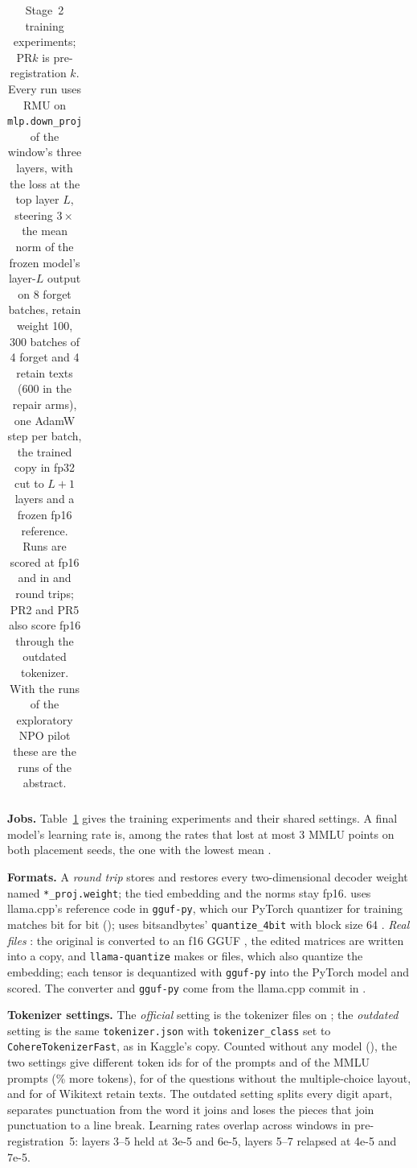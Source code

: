 \begin{table}[!t]
\begin{tabular}{@{}>{\raggedright\arraybackslash}p{} >{\raggedright\arraybackslash}p{} l >{\raggedright\arraybackslash}p{} >{\raggedleft\arraybackslash}p{}@{}}
\bottomrule
\end{tabular}
\caption{Stage~2 training experiments; PR$k$ is pre-registration $k$. Every run uses RMU on \texttt{mlp.down\_proj} of the window's three layers, with the loss at the top layer $L$, steering $3\times$ the mean norm of the frozen model's layer-$L$ output on 8 forget batches, retain weight 100, 300 batches of 4 forget and 4 retain texts (600 in the repair arms), one AdamW step per batch, the trained copy in fp32 cut to $L{+}1$ layers and a frozen fp16 reference. Runs are scored at fp16 and in \fq{} and \nf{} round trips; PR2 and PR5 also score fp16 through the outdated tokenizer. With the \totalNpo{} runs of the exploratory NPO pilot these are the \totalRuns{} runs of the abstract.}
\label{tab:experiments}
\end{table}

\textbf{Jobs.} Table~\ref{tab:experiments} gives the training experiments and their shared settings. A final model's learning rate is, among the rates that lost at most 3 MMLU points on both placement seeds, the one with the lowest mean \wmdp{}.

\textbf{Formats.} A \emph{round trip} stores and restores every two-dimensional decoder weight named \texttt{*\_proj.weight}; the tied embedding and the norms stay fp16. \fq{} uses llama.cpp's reference code in \texttt{gguf-py}, which our PyTorch quantizer for training matches bit for bit (); \nf{} uses bitsandbytes' \texttt{quantize\_4bit} with block size 64 \citep{bitsandbytes,dettmers2023qlora}. \emph{Real files} \citep{llamacpp}: the original is converted to an f16 GGUF \citep{gguf}, the edited matrices are written into a copy, and \texttt{llama-quantize} makes \fq{} or \qkm{} files, which also quantize the embedding; each tensor is dequantized with \texttt{gguf-py} into the PyTorch model and scored. The converter and \texttt{gguf-py} come from the llama.cpp commit in .

\textbf{Tokenizer settings.} The \emph{official} setting is the tokenizer files on ; the \emph{outdated} setting is the same \texttt{tokenizer.json} with \texttt{tokenizer\_class} set to \texttt{CohereTokenizerFast}, as in Kaggle's copy. Counted without any model (), the two settings give different token ids for \tokWmdpDiffer{} of the \tokWmdp{} \wmdp{} prompts and \tokMmluDiffer{} of the \tokMmlu{} MMLU prompts (\tokMore\% more tokens), for \tokBareDiffer{} of the \wmdp{} questions without the multiple-choice layout, and for \tokWikiDiffer{} of \tokWiki{} Wikitext retain texts. The outdated setting splits every digit apart, separates punctuation from the word it joins and loses the pieces that join punctuation to a line break. Learning rates overlap across windows in pre-registration~5: layers 3--5 held at 3e-5 and 6e-5, layers 5--7 relapsed at 4e-5 and 7e-5.

